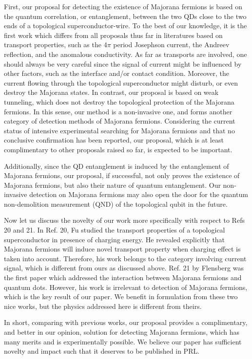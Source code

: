 \documentclass[11pt]{article}
\begin{document}
First, our proposal for detecting the existence of Majorana fermions is
based on the quantum correlation, or entanglement, between the two QDs
close to the two ends of a topological superconductor-wire. To the best
of our knowledge, it is the first work which differs from all proposals
thus far in literatures based on transport properties, such as the
4\(\pi\) period Josephson current, the Andreev reflection, and the
anomalous conductivity. As far as transports are involved, one should
always be very careful since the signal of current might be influenced
by other factors, such as the interface and/or contact condition.
Moreover, the current flowing through the topological superconductor
might disturb, or even destroy the Majorana states. In contrast, our
proposal is based on weak tunneling, which does not destroy the
topological protection of the Majorana fermions. In this sense, our
method is a non-invasive one, and forms another category of detection
methods of Majorana fermions. Considering the current status of
intensive experimental searching for Majorana fermions and that no
conclusive confirmation has been reported, our proposal, which is at
least complimentary to other proposals raised so far, is expected to be
important.

Additionally, since the QD entanglement is induced by the entanglement
of Majorana fermions, our proposal, if successful, not only proves the
existence of Majorana fermions, but also their nature of quantum
entanglement. Our non-invasive detection on Majorana fermions may also
open the door for the quantum non-demolition measurement (QND) of the
topological qubit in the future.

Now let us discuss the novelty of our work more specifically with
respect to Refs 20 and 21. In Ref. 20, Fu studied the transport
properties of a topological superconductor in presence of charging
energy. He revealed explicitly that Majorana fermions will induce novel
transport property when charging effect is taken into account.
Therefore, his work belongs to the category involving current signal,
which is different from ours as discussed above. Ref. 21 by Flensberg
was the first paper which addressed the interaction between Majorana
fermions and quantum dots. However, his work is irrelevant to detection
of Majorana fermions, which is the key result of our paper. We benefit
in formulation from these two nice works, but the physics addressed here
is different from theirs.

In short, comparing with previous works, our proposal provides a
complimentary, and better in our opinion, solution for detecting
Majorana fermions, which has many merits and is experimentally possible.
We believe our paper has sufficient novelty and impact such that it
deserves to be published in PRL.
\end{document}

